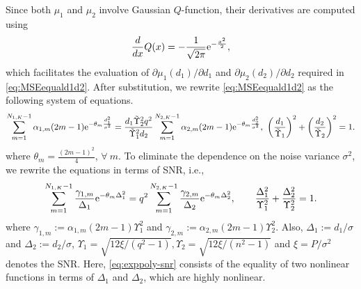 \documentclass[journal,12pt,onecolumn,draftclsnofoot]{IEEEtran}
\theoremstyle{definition}
\begin{document}
Since both $\mu_1$ and $\mu_2$ involve Gaussian $Q$-function, their derivatives are computed using
\begin{align}
\label{eq:derivative_q}
\frac{d}{dx} Q(x) = -\frac{1}{\sqrt{2\pi}}{\rm e}^{-\frac{x^2}{2}},
\end{align}
which facilitates the evaluation of ${\partial \mu_1(d_1)}/{\partial d_1}$ and ${\partial \mu_2(d_2)}/{\partial d_2}$ required in \eqref{eq:MSEequald1d2}. After substitution, we rewrite \eqref{eq:MSEequald1d2} as the following system of equations. 
\begin{align*}
\sum_{m=1}^{N_{1,K}-1} \alpha_{1,m}(2m-1)  {\rm e}^{-\theta_{m}  \frac{d_1^2}{\sigma^2}} = 
\frac{d_1\tilde{\Upsilon}_2^2q^2}{\tilde{\Upsilon}_1^2d_2}\sum_{m=1}^{N_{2,K}-1} \alpha_{2,m}(2m-1)  {\rm e}^{-\theta_{m} \frac{d_2^2}{\sigma^2}}, ~
\bigg(\frac{d_1}{\tilde{\Upsilon}_1}\bigg)^2 + \bigg(\frac{d_2}{\tilde{\Upsilon}_2}\bigg)^2  = 1.
\end{align*}
where $\theta_{m} = \frac{(2m-1)^2}{4}$, $\forall~m$. To eliminate the dependence on the noise variance $\sigma^2$, we rewrite the equations in terms of SNR, i.e.,
     \begin{align}
     \label{eq:exppoly-snr}
 \sum_{m=1}^{N_{1,K}-1} \frac{\gamma_{1,m}}{\Delta_1} {\rm e}^{-\theta_{m}  \Delta_1^2} = 
q^2\sum_{m=1}^{N_{2,K}-1} \frac{\gamma_{2,m}}{\Delta_2} {\rm e}^{-\theta_{m} \Delta_2^2}, \qquad
\frac{\Delta_1^2}{\Upsilon_1^2} + \frac{\Delta_2^2}{\Upsilon_2^2} = 1. 
\end{align}
where $\gamma_{1,m} :=\alpha_{1,m}(2m-1)\Upsilon_1^2$ and $\gamma_{2,m} :=\alpha_{2,m}(2m-1)\Upsilon_2^2$. Also, $\Delta_1 :={d}_1/\sigma$ and $\Delta_2 := {d}_2/\sigma$, $\Upsilon_1 =\sqrt{12\xi/(q^2-1)}, \Upsilon_2 =\sqrt{12\xi/(n^2-1)}$  and $\xi = {P}/\sigma^2$ denotes the SNR. Here, \eqref{eq:exppoly-snr} consists of the equality of two nonlinear functions in terms of $\Delta_1$ and $\Delta_2$, which are highly nonlinear.
\end{document}
